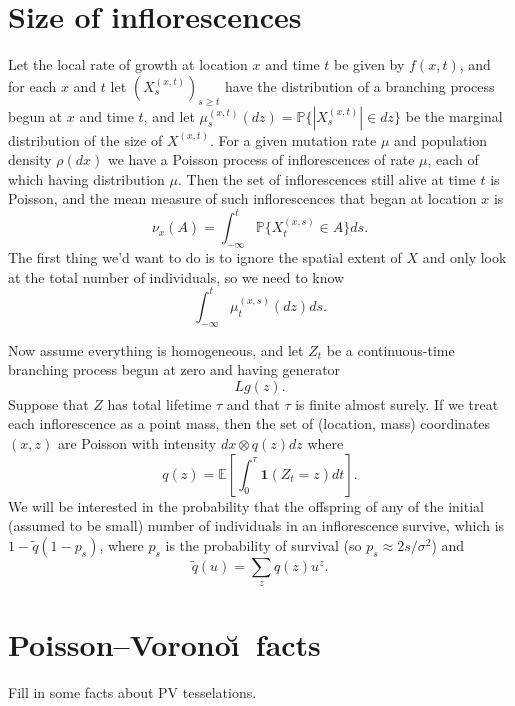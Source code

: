 \documentclass{article}
\renewcommand{\P}{\mathbb{P}}
\newcommand{\E}{\mathbb{E}}
\newcommand{\one}{\mathbf{1}}
\begin{document}
\section{Size of inflorescences}

Let the local rate of growth at location $x$ and time $t$ be given by $f(x,t)$,
and for each $x$ and $t$ let $(X^{(x,t)}_{s})_{s \ge t}$ have the distribution of a branching process begun at $x$ and time $t$,
and let $\mu^{(x,t)}_s(dz) = \P\{ |X^{(x,t)}_s| \in dz \}$  be the marginal distribution of the size of $X^{(x,t)}$.
For a given mutation rate $\mu$ and population density $\rho(dx)$ we have a Poisson process of inflorescences of rate $\mu$,
each of which having distribution $\mu$.  
Then the set of inflorescences still alive at time $t$ is Poisson, 
and the mean measure of such inflorescences that began at location $x$ is
\[ \nu_x(A) = \int_{-\infty}^t \P\{ X^{(x,s)}_t \in A \} ds .\]
The first thing we'd want to do is to ignore the spatial extent of $X$ and only look at the total number of individuals,
so we need to know
\[ \int_{-\infty}^t \mu^{(x,s)}_t(dz) ds . \]

Now assume everything is homogeneous, and let $Z_t$ be a continuous-time branching process begun at zero 
and having generator
\[ Lg(z) .\]
Suppose that $Z$ has total lifetime $\tau$ and that $\tau$ is finite almost surely.
If we treat each inflorescence as a point mass, then the set of (location, mass) coordinates $(x,z)$
are Poisson with intensity $dx \otimes q(z) dz$ where
\[  
  q(z) = \E \left[ \int_0^\tau \one(Z_t = z) dt \right] .
\]
We will be interested in the probability that the offspring of any of the initial (assumed to be small) number of individuals in an inflorescence survive,
which is $1 - \widetilde q(1-p_s)$, where $p_s$ is the probability of survival (so $p_s \approx 2s/\sigma^2$) and
\[
  \widetilde q(u) = \sum_z q(z) u^z .
\]

\section{Poisson--Vorono\u\i\ facts}

Fill in some facts about PV tesselations.
\end{document}

